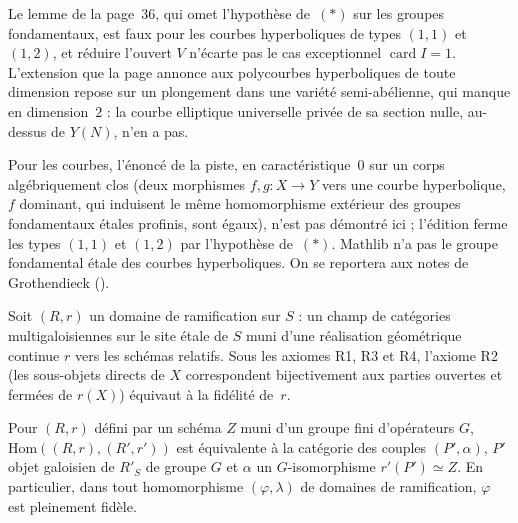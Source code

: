 \begin{encadre}
\begin{contrexemple*}\nonverifie
Le lemme de la page~36, qui omet l'hypothèse de~$(\ast)$ sur les groupes fondamentaux, est faux pour les courbes hyperboliques de types $(1,1)$ et $(1,2)$, et réduire l'ouvert $V$ n'écarte pas le cas exceptionnel $\operatorname{card} I = 1$. L'extension que la page annonce aux polycourbes hyperboliques de toute dimension repose sur un plongement dans une variété semi-abélienne, qui manque en dimension~$2$ : la courbe elliptique universelle privée de sa section nulle, au-dessus de $Y(N)$, n'en a pas.
\end{contrexemple*}
\end{encadre}
{\small Pour les courbes, l'énoncé de la piste, en caractéristique~$0$ sur un corps algébriquement clos (deux morphismes $f, g : X \to Y$ vers une courbe hyperbolique, $f$ dominant, qui induisent le même homomorphisme extérieur des groupes fondamentaux étales profinis, sont égaux), n'est pas démontré ici ; l'édition ferme les types $(1,1)$ et $(1,2)$ par l'hypothèse de~$(\ast)$. Mathlib n'a pas le groupe fondamental étale des courbes hyperboliques. On se reportera aux notes de Grothendieck ().\par}

\begin{encadre}
\begin{theoreme*}\nonverifie
Soit $(R, r)$ un domaine de ramification sur $S$ : un champ de catégories multigaloisiennes sur le site étale de $S$ muni d'une réalisation géométrique continue $r$ vers les schémas relatifs. Sous les axiomes R1, R3 et R4, l'axiome R2 (les sous-objets directs de $X$ correspondent bijectivement aux parties ouvertes et fermées de $r(X)$) équivaut à la fidélité de~$r$.
\end{theoreme*}
\end{encadre}

\begin{encadre}
\begin{enonce}\nonverifie
Pour $(R, r)$ défini par un schéma $Z$ muni d'un groupe fini d'opérateurs $G$, $\mathrm{Hom}((R,r),(R',r'))$ est équivalente à la catégorie des couples $(P', \alpha)$, $P'$ objet galoisien de $R'_S$ de groupe $G$ et $\alpha$ un $G$-isomorphisme $r'(P') \simeq Z$. En particulier, dans tout homomorphisme $(\varphi, \lambda)$ de domaines de ramification, $\varphi$ est pleinement fidèle.
\end{enonce}
\end{encadre}

